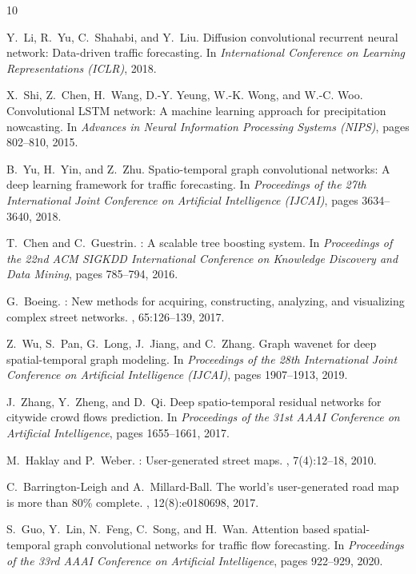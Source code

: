 \documentclass{article}
\begin{document}
\begin{thebibliography}{10}

Y.~Li, R.~Yu, C.~Shahabi, and Y.~Liu.
\newblock Diffusion convolutional recurrent neural network: Data-driven traffic forecasting.
\newblock In {\em International Conference on Learning Representations (ICLR)}, 2018.

X.~Shi, Z.~Chen, H.~Wang, D.-Y. Yeung, W.-K. Wong, and W.-C. Woo.
\newblock Convolutional {LSTM} network: A machine learning approach for precipitation nowcasting.
\newblock In {\em Advances in Neural Information Processing Systems (NIPS)}, pages 802--810, 2015.

B.~Yu, H.~Yin, and Z.~Zhu.
\newblock Spatio-temporal graph convolutional networks: A deep learning framework for traffic forecasting.
\newblock In {\em Proceedings of the 27th International Joint Conference on Artificial Intelligence (IJCAI)}, pages 3634--3640, 2018.

T.~Chen and C.~Guestrin.
: A scalable tree boosting system.
\newblock In {\em Proceedings of the 22nd ACM SIGKDD International Conference on Knowledge Discovery and Data Mining}, pages 785--794, 2016.

G.~Boeing.
: New methods for acquiring, constructing, analyzing, and visualizing complex street networks.
, 65:126--139, 2017.

Z.~Wu, S.~Pan, G.~Long, J.~Jiang, and C.~Zhang.
\newblock Graph wavenet for deep spatial-temporal graph modeling.
\newblock In {\em Proceedings of the 28th International Joint Conference on Artificial Intelligence (IJCAI)}, pages 1907--1913, 2019.

J.~Zhang, Y.~Zheng, and D.~Qi.
\newblock Deep spatio-temporal residual networks for citywide crowd flows prediction.
\newblock In {\em Proceedings of the 31st AAAI Conference on Artificial Intelligence}, pages 1655--1661, 2017.

M.~Haklay and P.~Weber.
: User-generated street maps.
, 7(4):12--18, 2010.

C.~Barrington-Leigh and A.~Millard-Ball.
\newblock The world's user-generated road map is more than 80\% complete.
, 12(8):e0180698, 2017.

S.~Guo, Y.~Lin, N.~Feng, C.~Song, and H.~Wan.
\newblock Attention based spatial-temporal graph convolutional networks for traffic flow forecasting.
\newblock In {\em Proceedings of the 33rd AAAI Conference on Artificial Intelligence}, pages 922--929, 2020.

\end{thebibliography}
\end{document}
